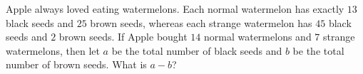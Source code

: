 Apple always loved eating watermelons. Each normal watermelon has exactly $13$ black seeds and $25$ brown seeds, whereas each strange watermelon has $45$ black seeds and $2$ brown seeds. If Apple bought $14$ normal watermelons and $7$ strange watermelons, then let $a$ be the total number of black seeds and $b$ be the total number of brown seeds. What is $a - b$?
